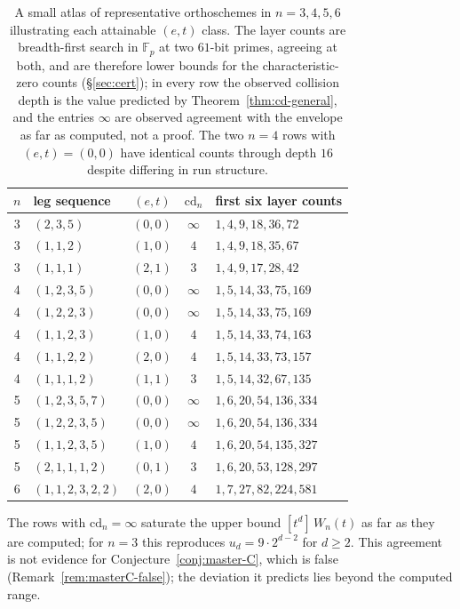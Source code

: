 \documentclass[11pt,a4paper]{article}
\newcommand{\cd}{\mathrm{cd}}
\theoremstyle{definition}
\theoremstyle{remark}
\theoremstyle{plain}
\begin{document}
\begin{table}[ht!]
\centering
\small
\renewcommand{\arraystretch}{1.2}
\begin{tabular}{c l c c l}
\toprule
$n$ & leg sequence & $(e,t)$ & $\cd_n$ & first six layer counts \\
\midrule
3 & $(2,3,5)$          & $(0,0)$ & $\infty$ & $1,4,9,18,36,72$ \\
3 & $(1,1,2)$          & $(1,0)$ & $4$      & $1,4,9,18,35,67$ \\
3 & $(1,1,1)$          & $(2,1)$ & $3$      & $1,4,9,17,28,42$ \\
\midrule
4 & $(1,2,3,5)$        & $(0,0)$ & $\infty$ & $1,5,14,33,75,169$ \\
4 & $(1,2,2,3)$        & $(0,0)$ & $\infty$ & $1,5,14,33,75,169$ \\
4 & $(1,1,2,3)$        & $(1,0)$ & $4$      & $1,5,14,33,74,163$ \\
4 & $(1,1,2,2)$        & $(2,0)$ & $4$      & $1,5,14,33,73,157$ \\
4 & $(1,1,1,2)$        & $(1,1)$ & $3$      & $1,5,14,32,67,135$ \\
\midrule
5 & $(1,2,3,5,7)$      & $(0,0)$ & $\infty$ & $1,6,20,54,136,334$ \\
5 & $(1,2,2,3,5)$      & $(0,0)$ & $\infty$ & $1,6,20,54,136,334$ \\
5 & $(1,1,2,3,5)$      & $(1,0)$ & $4$      & $1,6,20,54,135,327$ \\
5 & $(2,1,1,1,2)$      & $(0,1)$ & $3$      & $1,6,20,53,128,297$ \\
\midrule
6 & $(1,1,2,3,2,2)$    & $(2,0)$ & $4$      & $1,7,27,82,224,581$ \\
\bottomrule
\end{tabular}
\caption{A small atlas of representative orthoschemes in $n=3,4,5,6$ illustrating each
attainable $(e,t)$ class. The layer counts are breadth-first search in $\mathbb{F}_p$ at two
$61$-bit primes, agreeing at both, and are therefore lower bounds for the characteristic-zero
counts (\S\ref{sec:cert}); in every row the observed collision depth is the value predicted by
Theorem~\ref{thm:cd-general}, and the entries $\infty$ are observed agreement with the envelope
as far as computed, not a proof. The two $n=4$ rows with $(e,t)=(0,0)$ have identical counts
through depth $16$ despite differing in run structure.}
\label{tab:atlas}
\end{table}

The rows with $\cd_n=\infty$ saturate the upper bound $[t^d]\,W_n(t)$ as far as they are
computed; for $n=3$ this reproduces $u_d=9\cdot2^{d-2}$ for $d\ge2$. This agreement is not
evidence for Conjecture~\ref{conj:master-C}, which is false
(Remark~\ref{rem:masterC-false}); the deviation it predicts lies beyond the computed range.
\end{document}
